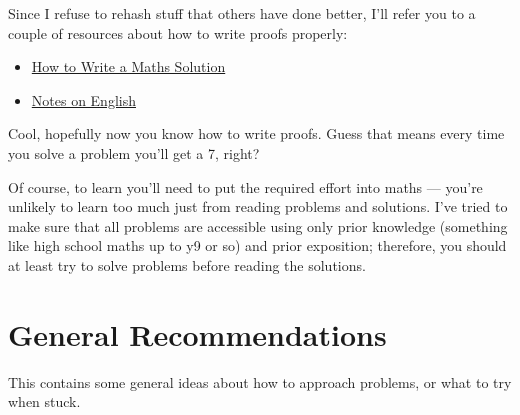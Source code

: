 Since I refuse to rehash stuff that others have done better, I'll refer you to a
couple of resources about how to write proofs properly:
\begin{itemize}
  \item
    \href{https://artofproblemsolving.com/news/articles/how-to-write-a-solution}
    {How to Write a Maths Solution}
  \item \href{https://web.evanchen.cc/handouts/english/english.pdf}{Notes on
    English}
\end{itemize}
Cool, hopefully now you know how to write proofs. Guess that means every time 
you solve a problem you'll get a 7, right?

Of course, to learn you'll need to put the required effort into maths --- you're
unlikely to learn too much just from reading problems and solutions. I've
tried to make sure that all problems are accessible using only prior knowledge
(something like high school maths up to y9 or so) and prior exposition;
therefore, you should at least try to solve problems before reading the
solutions.
\section*{General Recommendations}
This contains some general ideas about how to approach problems, or what to
try when stuck.

